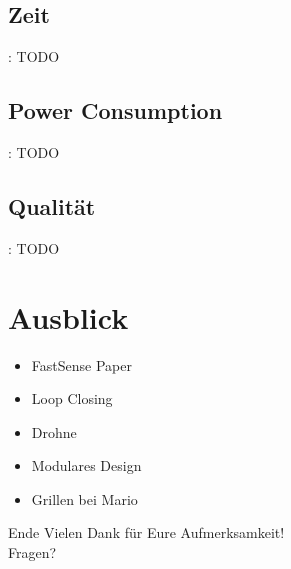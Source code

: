\documentclass{beamer}
\begin{document}
\subsection{Zeit}
\begin{frame}{\secname: \subsecname}
TODO
\end{frame}

\subsection{Power Consumption}
\begin{frame}{\secname: \subsecname}
TODO
\end{frame}

\subsection{Qualität}
\begin{frame}{\secname: \subsecname}
TODO
\end{frame}

\section{Ausblick}
\begin{frame}{\secname}
\begin{itemize}
\item{FastSense Paper}
\item{Loop Closing}
\item{Drohne}
\item{Modulares Design}
\item{Grillen bei Mario}
\end{itemize}
\end{frame}

\begin{frame}{Ende}
\centering\LARGE
Vielen Dank für Eure Aufmerksamkeit!\\\vspace{1cm}
Fragen?
\end{frame}
\end{document}
